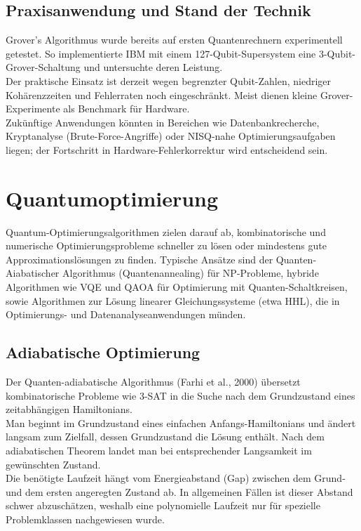 \subsection{Praxisanwendung und Stand der Technik}

Grover’s Algorithmus wurde bereits auf ersten Quantenrechnern experimentell getestet. So implementierte IBM mit einem 127-Qubit-Supersystem eine 3-Qubit-Grover-Schaltung und untersuchte deren Leistung.\\
Der praktische Einsatz ist derzeit wegen begrenzter Qubit-Zahlen, niedriger Kohärenzzeiten und Fehlerraten noch eingeschränkt. Meist dienen kleine Grover-Experimente als Benchmark für Hardware.\\
Zukünftige Anwendungen könnten in Bereichen wie Datenbankrecherche, Kryptanalyse (Brute-Force-Angriffe) oder NISQ-nahe Optimierungsaufgaben liegen; der Fortschritt in Hardware-Fehlerkorrektur wird entscheidend sein.

\section{Quantumoptimierung}
Quantum-Optimierungsalgorithmen zielen darauf ab, kombinatorische und numerische Optimierungsprobleme schneller zu lösen oder mindestens gute Approximationslösungen zu finden. Typische Ansätze sind der Quanten-Aiabatischer Algorithmus (Quantenannealing) für NP-Probleme, hybride Algorithmen wie VQE und QAOA für Optimierung mit Quanten-Schaltkreisen, sowie Algorithmen zur Lösung linearer Gleichungssysteme (etwa HHL), die in Optimierungs- und Datenanalyseanwendungen münden.

\subsection{Adiabatische Optimierung}

Der Quanten-adiabatische Algorithmus (Farhi et al., 2000) übersetzt kombinatorische Probleme wie 3-SAT in die Suche nach dem Grundzustand eines zeitabhängigen Hamiltonians.\\
Man beginnt im Grundzustand eines einfachen Anfangs-Hamiltonians und ändert langsam zum Zielfall, dessen Grundzustand die Lösung enthält. Nach dem adiabatischen Theorem landet man bei entsprechender Langsamkeit im gewünschten Zustand.\\
Die benötigte Laufzeit hängt vom Energieabstand (Gap) zwischen dem Grund- und dem ersten angeregten Zustand ab. In allgemeinen Fällen ist dieser Abstand schwer abzuschätzen, weshalb eine polynomielle Laufzeit nur für spezielle Problemklassen nachgewiesen wurde.\\

